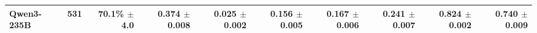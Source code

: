 \begin{table}[t]
\begin{tabular*}{\textwidth}{@{\extracolsep{\fill}}lrrrrrrrrr@{}}
Qwen3-235B & 531 & \shortstack[r]{70.1\%\\{\scriptsize $\pm$4.0}} & \shortstack[r]{0.374\\{\scriptsize $\pm$0.008}} & \shortstack[r]{0.025\\{\scriptsize $\pm$0.002}} & \shortstack[r]{0.156\\{\scriptsize $\pm$0.005}} & \shortstack[r]{0.167\\{\scriptsize $\pm$0.006}} & \shortstack[r]{0.241\\{\scriptsize $\pm$0.007}} & \shortstack[r]{0.824\\{\scriptsize $\pm$0.002}} & \shortstack[r]{0.740\\{\scriptsize $\pm$0.009}} \\
\bottomrule
\end{tabular*}
\end{table}
